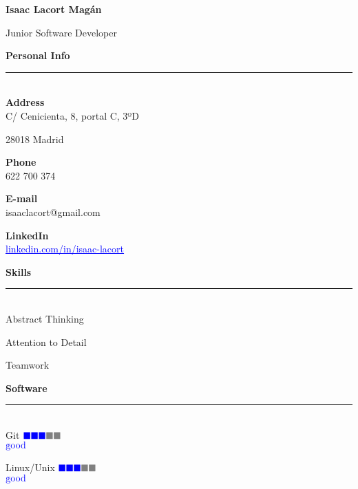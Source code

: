 \documentclass{article}
\begin{document}
\thispagestyle{empty} 
\textbf{\huge{Isaac Lacort Magán}}

\large{\color{BlueViolet}Junior Software Developer}

\vspace{1cm}

\begin{minipage}{0.3\linewidth}
  
  \setlength{\parskip}{0.3em}
  \textbf{\Large{\color{BlueViolet}Personal Info}}\\[-0.25cm]
  {\color{BlueViolet} \rule{\linewidth}{0.1mm} } \\[-0.25cm]
  \textbf{\large{Address}}\\  
  C/ Cenicienta, 8, portal C, 3ºD
  
  28018 Madrid

  \textbf{\large{Phone}}\\
  622 700 374

  \textbf{\large{E-mail}}\\
  isaaclacort@gmail.com
  
  \textbf{\large{LinkedIn}}\\
  \href{https://www.linkedin.com/in/isaac-lacort-706725168/}{\textcolor{blue}{\underline{linkedin.com/in/isaac-lacort}}}
  
  \vspace{0.3cm}
  \textbf{\Large{\color{BlueViolet}Skills}}\\[-0.25cm]
  {\color{BlueViolet} \rule{\linewidth}{0.1mm} }\\[-0.25cm]
  Abstract Thinking 

  Attention to Detail

  Teamwork
  
  \vspace{0.3cm}
  \textbf{\Large{\color{BlueViolet}Software}}\\[-0.25cm]
  {\color{BlueViolet} \rule{\linewidth}{0.1mm} }\\
  \large Git \hfill $\color{blue} \blacksquare\color{blue} \blacksquare \color{blue} \blacksquare \color{gray} \blacksquare  \color{gray} \blacksquare$  \\[-0.8mm]
  \null\hfill \small{ $\color{blue} \textnormal{good}$}

  \large Linux/Unix \hfill $\color{blue} \blacksquare\color{blue} \blacksquare \color{blue} \blacksquare \color{gray} \blacksquare  \color{gray} \blacksquare$  \\[-0.8mm]
  \null\hfill \small{ $\color{blue} \textnormal{good}$}


\end{minipage}
\end{document}
